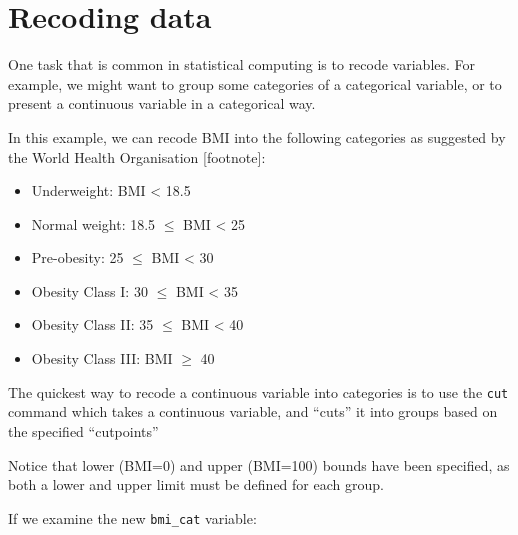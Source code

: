 \documentclass[
]{memoir}
\newenvironment{Shaded}{\begin{snugshade}}{\end{snugshade}}
\newcommand{\AttributeTok}[1]{\textcolor[rgb]{0.77,0.63,0.00}{#1}}
\newcommand{\DecValTok}[1]{\textcolor[rgb]{0.00,0.00,0.81}{#1}}
\newcommand{\FloatTok}[1]{\textcolor[rgb]{0.00,0.00,0.81}{#1}}
\newcommand{\FunctionTok}[1]{\textcolor[rgb]{0.00,0.00,0.00}{#1}}
\newcommand{\NormalTok}[1]{#1}
\newcommand{\OtherTok}[1]{\textcolor[rgb]{0.56,0.35,0.01}{#1}}
\newcommand{\SpecialCharTok}[1]{\textcolor[rgb]{0.00,0.00,0.00}{#1}}
\providecommand{\tightlist}{%
  \setlength{\itemsep}{0pt}\setlength{\parskip}{0pt}}
\begin{document}
\hypertarget{recoding-data}{%
\section{Recoding data}\label{recoding-data}}

One task that is common in statistical computing is to recode variables. For example, we might want to group some categories of a categorical variable, or to present a continuous variable in a categorical way.

In this example, we can recode BMI into the following categories as suggested by the World Health Organisation {[}footnote{]}:

\begin{itemize}
\tightlist
\item
  Underweight: BMI \textless{} 18.5
\item
  Normal weight: 18.5 \(\le\) BMI \textless{} 25
\item
  Pre-obesity: 25 \(\le\) BMI \textless{} 30
\item
  Obesity Class I: 30 \(\le\) BMI \textless{} 35
\item
  Obesity Class II: 35 \(\le\) BMI \textless{} 40
\item
  Obesity Class III: BMI \(\ge\) 40
\end{itemize}

The quickest way to recode a continuous variable into categories is to use the \texttt{cut} command which takes a continuous variable, and ``cuts'' it into groups based on the specified ``cutpoints''

\begin{Shaded}
\end{Shaded}

Notice that lower (BMI=0) and upper (BMI=100) bounds have been specified, as both a lower and upper limit must be defined for each group.

If we examine the new \texttt{bmi\_cat} variable:
\end{document}
